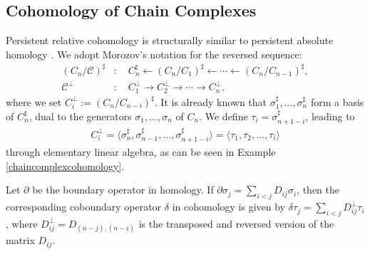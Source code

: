 \subsection{Cohomology of Chain Complexes}
Persistent relative cohomology is structurally similar to persistent absolute homology \cite[\S 2.7]{de2011dualities}. We adopt Morozov's notation for the reversed sequence:
\begin{align}
	(C_n / \mathcal{C})^\sharp &: \quad C_n^\sharp \leftarrow (C_n / C_1)^\sharp \leftarrow \cdots \leftarrow (C_n / C_{n-1})^\sharp, \\
	\mathcal{C}^\perp &: \quad C_1^\perp \rightarrow C_2^\perp \rightarrow \cdots \rightarrow C_n^\perp,
\end{align}
where we set \( C_i^\perp := (C_n / C_{n-i})^\sharp \). It is already known that \( \sigma_1^\sharp, \ldots, \sigma_n^\sharp \) form a basis of \( C_n^\sharp \), dual to the generators \( \sigma_1, \ldots, \sigma_n \) of \( C_n \). We define \( \tau_i = \sigma^\sharp_{n+1-i} \), leading to
\begin{align}
	C_i^\perp = \langle \sigma_n^\sharp, \sigma_{n-1}^\sharp, \ldots, \sigma_{n+1-i}^\sharp \rangle = \langle \tau_1, \tau_2, \ldots, \tau_i \rangle
\end{align}
through elementary linear algebra, as can be seen in Example \ref{chaincomplexcohomology}.

\begin{proposition}
Let \( \partial \) be the boundary operator in homology. If \( \partial \sigma_j = \sum_{i < j} D_{ij} \sigma_i \), then the corresponding coboundary operator \( \delta \) in cohomology is given by $\delta \tau_j = \sum_{i < j} D_{ij}^\perp \tau_i$, where \( D_{ij}^\perp = D_{(n-j),(n-i)} \) is the transposed and reversed version of the matrix \( D_{ij} \). 
\end{proposition}

